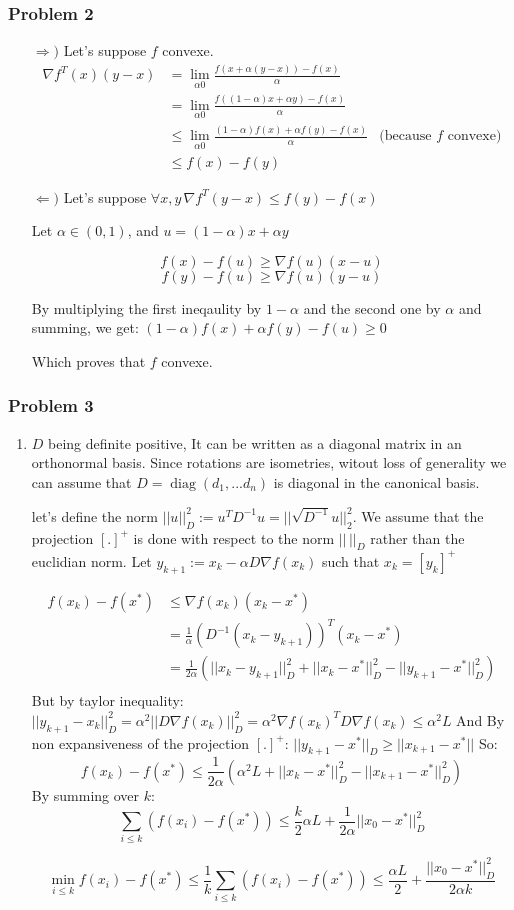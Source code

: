 \documentclass[12pt]{article}
\newcommand{\Q}[1]{\subsubsection*{Problem #1}}
\begin{document}
\Q{2}

\begin{itemize}
\item[$\Rightarrow)$] Let's suppose $f$ convexe.
  \begin{align*}
    \nabla f^T(x) (y-x)
    &= \lim_{\alpha 0} \frac{f(x + \alpha(y-x)) - f(x)}{\alpha}
    \\&= \lim_{\alpha 0} \frac{f((1-\alpha)x + \alpha y) - f(x)}{\alpha}
    \\&\le \lim_{\alpha 0} \frac{(1-\alpha)f(x) + \alpha f(y) - f(x)}{\alpha} &\text{(because $f$ convexe)}
    \\&\le f(x) - f(y)
  \end{align*}
\item[$\Leftarrow)$] Let's suppose $\forall x, y \, \nabla f^T (y-x) \le f(y) - f(x)$
  
  Let $\alpha \in (0, 1)$, and $u = (1-\alpha)x + \alpha y$
  
  $$f(x) - f(u) \ge \nabla f(u) (x-u)$$
  $$f(y) - f(u) \ge \nabla f(u) (y-u)$$

  By multiplying the first ineqaulity by $1-\alpha$ and the second one by $\alpha$ and summing, we get:
  $(1-\alpha) f(x) + \alpha f(y) - f(u) \ge 0$

  Which proves that $f$ convexe.
\end{itemize}


\Q{3}
\begin{enumerate}
\item
  $D$ being definite positive, It can be written as a diagonal matrix in an orthonormal basis.
  Since  rotations are isometries, witout loss of generality we can assume that $D = \operatorname{diag}(d_1, ... d_n) $ is diagonal in the canonical basis.


  let's define the norm $||u||_D^2 := u^T D^{-1} u = ||\sqrt{D^{-1}}u||_2^2$.
  We assume that the projection $[.]^+$ is done with
  respect to the norm $||\, ||_D$ rather than the euclidian norm.
  Let $y_{k+1} := x_k - \alpha D \nabla f(x_k)$ such that $x_k = [y_k]^+$

  \begin{align*}
    f(x_k) - f(x^*) & \le \nabla f(x_k) (x_k - x^*) \\
                    &= \frac1 \alpha (D^{-1}(x_k - y_{k+1}))^T (x_k - x^*) \\
                    &= \frac1 {2\alpha} ( ||x_k - y_{k+1}||_D^2 + ||x_k - x^*||_D^2 - ||y_{k+1} - x^*||_D^2 ) \\
  \end{align*}
  But by taylor inequality:
  $||y_{k+1} - x_k||_D^2 = \alpha^2 ||D \nabla f (x_k)||_D^2 = \alpha^2 \nabla f(x_k)^T D \nabla f(x_k) \le \alpha^2 L$
  And By non expansiveness of the projection $[.]^+$:  $||y_{k+1} - x^*||_D \ge ||x_{k+1} - x^*||$
  So:
  $$f(x_k) - f(x^*) \le \frac 1{2\alpha} (\alpha^2 L + ||x_k - x^*||_D^2 - ||x_{k+1} - x^*||_D^2)$$
  By summing over $k$:
  $$\sum_{i \le k} (f(x_i) - f(x^*)) \le \frac{k}2 \alpha L + \frac{1}{2\alpha} ||x_0 - x^*||_D^2$$


  $$\min_{i \le k} f(x_i) - f(x^*) \le \frac1k \sum_{i \le k} (f(x_i) - f(x^*)) \le \frac{\alpha L} {2}  + \frac{||x_0 - x^*||_D^2}{2\alpha k}$$
 \end{enumerate}
\end{document}
